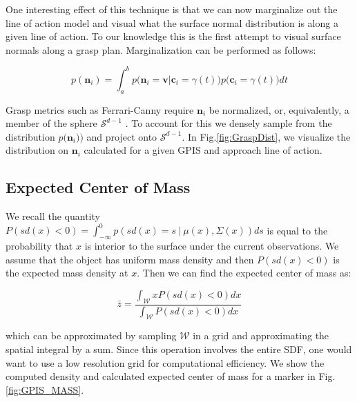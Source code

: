 \documentclass[journal,transmag]{IEEEtran}%
\begin{document}
One interesting effect of this technique is that we can now marginalize out the line of action model and visual what the surface normal distribution is along a given line of action. To our knowledge this is the first attempt to visual surface normals along a grasp plan. Marginalization can be performed as follows:

\vspace{-2ex}
\begin{equation}
    p(\textbf{n}_i ) = \int_a^b   p\big(\textbf{n}_i = \textbf{v} | \textbf{c}_i = \gamma(t) \big)p\big(\textbf{c}_i = \gamma(t)\big) dt \label{eq:normal_dist}
\end{equation}

Grasp metrics such as  Ferrari-Canny require $\textbf{n}_i$ be normalized, or, equivalently, a member of the sphere $\mathcal{S}^{d-1}$ \cite{ferrari1992}. To account for this we densely sample from the  distribution $p \big(\textbf{n}_i ) \big)$  and project onto $\mathcal{S}^{d-1}$.  In Fig.\ref{fig:GraspDist}, we visualize the distribution on $\textbf{n}_i$ calculated for a given GPIS and approach line of action.


\subsection{Expected Center of Mass}\label{sec:mass} 

We recall the quantity $P(sd(x) < 0) = \int_{-\infty}^{0} p(sd(x) =  s \ | \ \mu(x),\Sigma(x)) ds$ is equal to the probability that $x$ is interior to the surface under the current observations.
We assume that the object has uniform mass density and then $P(sd(x) < 0)$ is the expected mass density at $x$.
Then we can find the expected center of mass as:

\label{eq:mass}
\begin{equation}
  \bar{z} 
  =
  \frac
    {\int_{\mathcal{W}}x P(sd(x)<0) dx}
    {\int_{\mathcal{W}}  P(sd(x)<0) dx}
\end{equation}

which can be approximated by sampling $\mathcal{W}$ in a grid and approximating the spatial integral by a sum. Since this operation involves the entire SDF, one would want to use a low resolution grid for computational efficiency. We show the computed density and calculated expected center of mass for a marker in Fig. \ref{fig:GPIS_MASS}.
\end{document}
